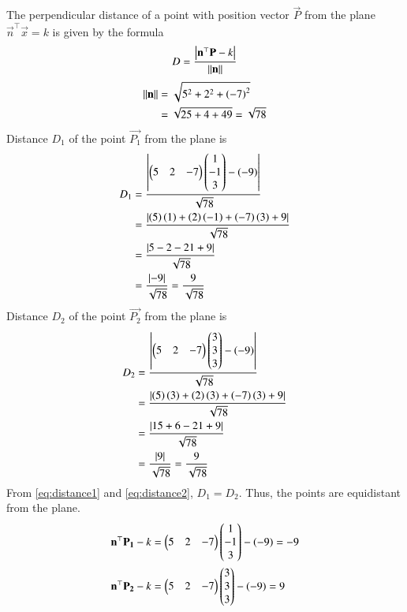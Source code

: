 \documentclass[journal]{IEEEtran}
\begin{document}
The perpendicular distance of a point with position vector $\vec{P}$ from the plane $\vec{n}^\top\vec{x} = k$ is given by the formula
\begin{align}
    D = \frac{\left\vert\mathbf{n}^\top\mathbf{P} - k\right\vert}{\left\lVert\mathbf{n}\right\rVert}
\end{align}
\begin{align}
    \left\lVert\mathbf{n}\right\rVert &= \sqrt{5^2 + 2^2 + \left(-7\right)^2} \\
    &= \sqrt{25 + 4 + 49} = \sqrt{78}
\end{align}
Distance $D_1$ of the point $\vec{P_1}$ from the plane is
\begin{align}
    D_1 &= \frac{\left\vert\begin{pmatrix}5 & 2 & -7\end{pmatrix}\begin{pmatrix}1 \\ -1 \\ 3\end{pmatrix} - \left(-9\right)\right\vert}{\sqrt{78}} \\
    &= \frac{\left\vert\left(5\right)\left(1\right) + \left(2\right)\left(-1\right) + \left(-7\right)\left(3\right) + 9\right\vert}{\sqrt{78}} \\
    &= \frac{\left\vert5 - 2 - 21 + 9\right\vert}{\sqrt{78}} \\
    &= \frac{\left\vert-9\right\vert}{\sqrt{78}} = \frac{9}{\sqrt{78}} \label{eq:distance1}
\end{align}
Distance $D_2$ of the point $\vec{P_2}$ from the plane is
\begin{align}
    D_2 &= \frac{\left\vert\begin{pmatrix}5 & 2 & -7\end{pmatrix}\begin{pmatrix}3 \\ 3 \\ 3\end{pmatrix} - \left(-9\right)\right\vert}{\sqrt{78}} \\
    &= \frac{\left\vert\left(5\right)\left(3\right) + \left(2\right)\left(3\right) + \left(-7\right)\left(3\right) + 9\right\vert}{\sqrt{78}} \\
    &= \frac{\left\vert15 + 6 - 21 + 9\right\vert}{\sqrt{78}} \\
    &= \frac{\left\vert9\right\vert}{\sqrt{78}} = \frac{9}{\sqrt{78}} \label{eq:distance2}
\end{align}
From \eqref{eq:distance1} and \eqref{eq:distance2}, $D_1 = D_2$. Thus, the points are equidistant from the plane. \\

\begin{align}
    \mathbf{n}^\top\mathbf{P_1} - k &= \begin{pmatrix}5 & 2 & -7\end{pmatrix}\begin{pmatrix}1 \\ -1 \\ 3\end{pmatrix} - \left(-9\right) = -9 \label{eq:3} \\
    \mathbf{n}^\top\mathbf{P_2} - k &= \begin{pmatrix}5 & 2 & -7\end{pmatrix}\begin{pmatrix}3 \\ 3 \\ 3\end{pmatrix} - \left(-9\right) = 9 \label{eq:4}
\end{align}
\end{document}
